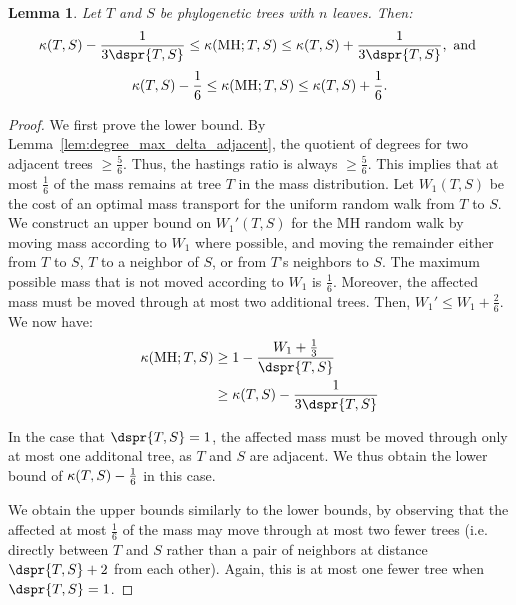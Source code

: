 \documentclass[11pt,onecolumn,conference]{IEEEtran}
\newtheorem{lemma}[theorem]{Lemma}
\newcommand{\MH}{\operatorname{MH}}
\newcommand{\curvature}[2][]{%
    \ifthenelse{\equal{#1}{}}%
		{\kappa(#2)}%
		{\kappa_{#1}(#2)}%
}
\begin{document}
\begin{lemma}
	Let $T$ and $S$ be phylogenetic trees with $n$ leaves. Then:
	$$\curvature{T,S} - \frac{1}{3\dspr{T,S}}
	\le \curvature{\MH; T,S}
	\le \curvature{T,S} + \frac{1}{3\dspr{T,S}}, \text{ and }$$
	$$\curvature{T,S} - \frac{1}{6}
	\le \curvature{\MH; T,S}
	\le \curvature{T,S} + \frac{1}{6}.$$
\end{lemma}
\begin{proof}
	We first prove the lower bound.
	By Lemma~\ref{lem:degree_max_delta_adjacent}, the quotient of degrees for two adjacent trees $\ge \frac{5}{6}$.
	Thus, the hastings ratio is always $\ge \frac{5}{6}$.
	This implies that at most $\frac{1}{6}$ of the mass remains at tree $T$ in the mass distribution.
	Let $W_1(T,S)$ be the cost of an optimal mass transport for the uniform random walk from $T$ to $S$.
	We construct an upper bound on $W_1'(T,S)$ for the MH random walk by moving mass according to $W_1$ where possible, and moving the remainder either from $T$ to $S$, $T$ to a neighbor of $S$, or from $T$'s neighbors to $S$.
	The maximum possible mass that is not moved according to $W_1$ is $\frac{1}{6}$.
	Moreover, the affected mass must be moved through at most two additional trees.
	Then, $W_1' \le W_1 + \frac{2}{6}$.
	We now have:
	\begin{align*}
		\curvature{\MH; T,S} & \ge 1 - \frac{W_1 + \frac{1}{3}}{\dspr{T,S}} \\
		& \ge \curvature{T,S} - \frac{1}{3\dspr{T,S}}
	\end{align*}

	In the case that $\dspr{T,S}=1$, the affected mass must be moved through only at most one additonal tree, as $T$ and $S$ are adjacent.
	We thus obtain the lower bound of $\curvature{T,S} - \frac{1}{6}$ in this case.

	We obtain the upper bounds similarly to the lower bounds, by observing that the affected at most $\frac{1}{6}$ of the mass may move through at most two fewer trees (i.e. directly between $T$ and $S$ rather than a pair of neighbors at distance $\dspr{T,S} + 2$ from each other).
	Again, this is at most one fewer tree when $\dspr{T,S}=1$.
\end{proof}
\end{document}
